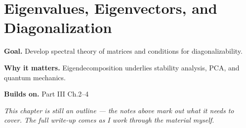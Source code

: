 \chapter{Eigenvalues, Eigenvectors, and Diagonalization}
\label{ch:03-linear-algebra-05}

\begin{chapterintro}
\textbf{Goal.} Develop spectral theory of matrices and conditions for diagonalizability.

\textbf{Why it matters.} Eigendecomposition underlies stability analysis, PCA, and quantum mechanics.

\textbf{Builds on.} Part III Ch.2–4
\end{chapterintro}

\textit{This chapter is still an outline --- the notes above mark out what it needs to cover. The full write-up comes as I work through the material myself.}
